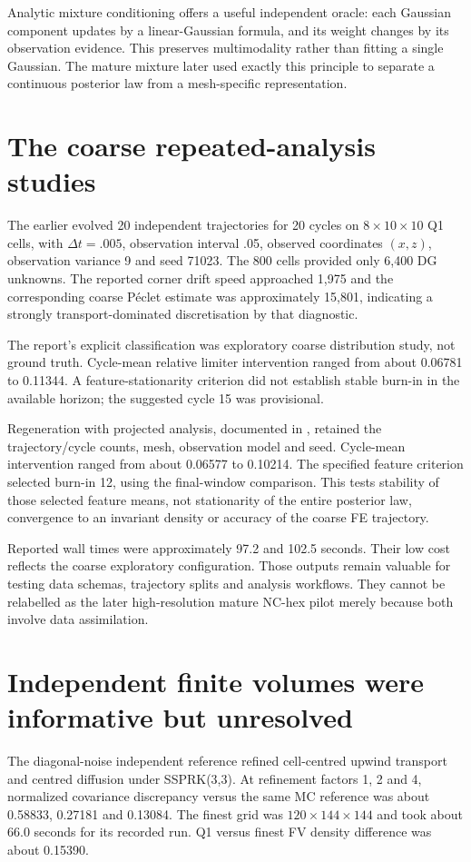 Analytic mixture conditioning offers a useful independent oracle: each Gaussian component updates by a linear-Gaussian formula, and its weight changes by its observation evidence. This preserves multimodality rather than fitting a single Gaussian. The mature mixture later used exactly this principle to separate a continuous posterior law from a mesh-specific representation.

\section{The coarse repeated-analysis studies}
The earlier  evolved 20 independent trajectories for 20 cycles on $8\times10\times10$ Q1 cells, with $\Delta t=.005$, observation interval .05, observed coordinates $(x,z)$, observation variance 9 and seed 71023. The 800 cells provided only 6,400 DG unknowns. The reported corner drift speed approached 1,975 and the corresponding coarse P\'eclet estimate was approximately 15,801, indicating a strongly transport-dominated discretisation by that diagnostic.

The report's explicit classification was exploratory coarse distribution study, not ground truth. Cycle-mean relative limiter intervention ranged from about 0.06781 to 0.11344. A feature-stationarity criterion did not establish stable burn-in in the available horizon; the suggested cycle 15 was provisional.

Regeneration with projected analysis, documented in , retained the trajectory/cycle counts, mesh, observation model and seed. Cycle-mean intervention ranged from about 0.06577 to 0.10214. The specified feature criterion selected burn-in 12, using the final-window comparison. This tests stability of those selected feature means, not stationarity of the entire posterior law, convergence to an invariant density or accuracy of the coarse FE trajectory.

Reported wall times were approximately 97.2 and 102.5 seconds. Their low cost reflects the coarse exploratory configuration. Those outputs remain valuable for testing data schemas, trajectory splits and analysis workflows. They cannot be relabelled as the later high-resolution mature NC-hex pilot merely because both involve data assimilation.

\section{Independent finite volumes were informative but unresolved}
The diagonal-noise independent reference refined cell-centred upwind transport and centred diffusion under SSPRK(3,3). At refinement factors 1, 2 and 4, normalized covariance discrepancy versus the same MC reference was about 0.58833, 0.27181 and 0.13084. The finest grid was $120\times144\times144$ and took about 66.0 seconds for its recorded run. Q1 versus finest FV density difference was about 0.15390.

